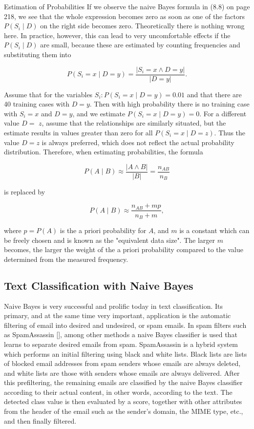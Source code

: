 \documentclass[10pt]{book}
\begin{document}
Estimation of Probabilities If we observe the naive Bayes formula in (8.8) on page 218, we see that the whole expression becomes zero as soon as one of the factors $P\left(S_{i} \mid D\right)$ on the right side becomes zero. Theoretically there is nothing wrong here. In practice, however, this can lead to very uncomfortable effects if the $P\left(S_{i} \mid D\right)$ are small, because these are estimated by counting frequencies and substituting them into

$$
P\left(S_{i}=x \mid D=y\right)=\frac{\left|S_{i}=x \wedge D=y\right|}{|D=y|} .
$$

Assume that for the variables $S_{i}: P\left(S_{i}=x \mid D=y\right)=0.01$ and that there are 40 training cases with $D=y$. Then with high probability there is no training case with $S_{i}=x$ and $D=y$, and we estimate $P\left(S_{i}=x \mid D=y\right)=0$. For a different value $D=$ $z$, assume that the relationships are similarly situated, but the estimate results in values greater than zero for all $P\left(S_{i}=x \mid D=z\right)$. Thus the value $D=z$ is always preferred, which does not reflect the actual probability distribution. Therefore, when estimating probabilities, the formula

$$
P(A \mid B) \approx \frac{|A \wedge B|}{|B|}=\frac{n_{A B}}{n_{B}}
$$

is replaced by

$$
P(A \mid B) \approx \frac{n_{A B}+m p}{n_{B}+m},
$$

where $p=P(A)$ is the a priori probability for $A$, and $m$ is a constant which can be freely chosen and is known as the "equivalent data size". The larger $m$ becomes, the larger the weight of the a priori probability compared to the value determined from the measured frequency.

\subsection{Text Classification with Naive Bayes}
Naive Bayes is very successful and prolific today in text classification. Its primary, and at the same time very important, application is the automatic filtering of email into desired and undesired, or spam emails. In spam filters such as SpamAssassin [\cite{schwartz2004spamassassin}], among other methods a naive Bayes classifier is used that learns to separate desired emails from spam. SpamAssassin is a hybrid system which performs an initial filtering using black and white lists. Black lists are lists of blocked email addresses from spam senders whose emails are always deleted, and white lists are those with senders whose emails are always delivered. After this prefiltering, the remaining emails are classified by the naive Bayes classifier according to their actual content, in other words, according to the text. The detected class value is then evaluated by a score, together with other attributes from the header of the email such as the sender's domain, the MIME type, etc., and then finally filtered.
\end{document}
